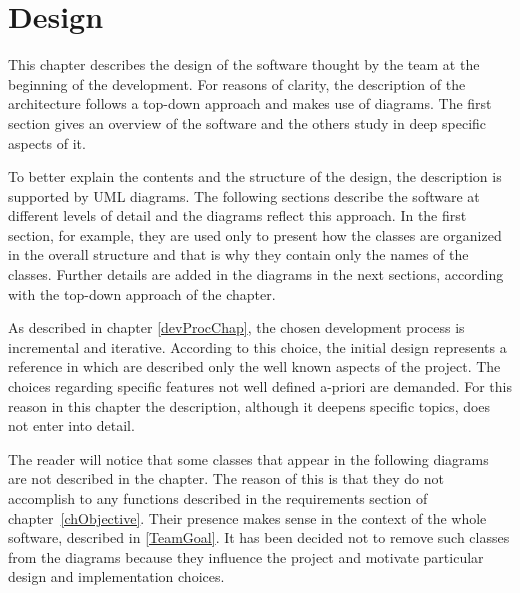 \chapter{Design}
	This chapter describes the design of the software thought by the team at the beginning of the development.
	For reasons of clarity, the description of the architecture follows a top-down approach and makes use of diagrams. 		The first section gives an overview of the software and the others study in deep specific aspects of it.

	To better explain the contents and the structure of the design, the description is supported by \mbox{UML} diagrams. The following sections describe the software at different levels of detail and the diagrams reflect this approach. In the first section, for example, they are used only to present how the classes are organized in the overall structure and that is why they contain only the names of the classes. Further details are added in the diagrams in the next sections, according with the top-down approach of the chapter.

	As described in chapter \ref{devProcChap}, the chosen development process is incremental and iterative.
	According to this choice, the initial design represents a reference in which are described only the well known aspects of the project. The choices regarding specific features not well defined a-priori are demanded. For this reason in this chapter the description, although it deepens specific topics, does not enter into detail. 
		
	The reader will notice that some classes that appear in the following diagrams are not described in the chapter. The reason of this is that they do not accomplish to any functions described in the requirements section of \mbox{chapter \ref{chObjective}}. Their presence makes sense in the context of the whole software, described in \ref{TeamGoal}. It has been decided not to remove such classes from the diagrams because they influence the project and motivate particular design and implementation choices.

